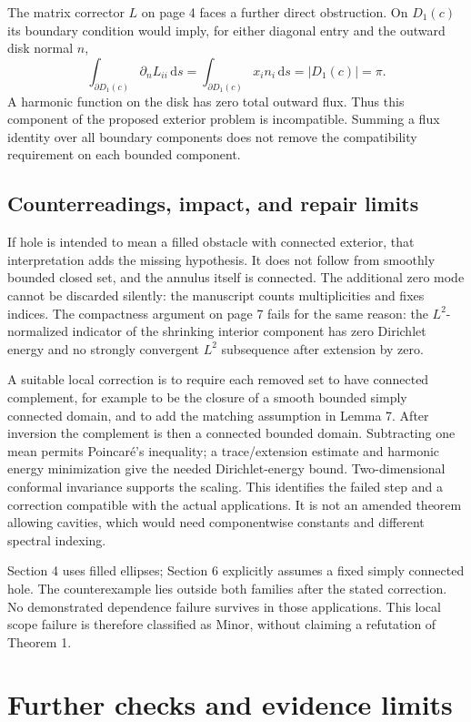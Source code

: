 \documentclass[10pt]{article}
\begin{document}
The matrix corrector \(L\) on page 4 faces a further direct obstruction. On \(D_1(c)\) its boundary condition would imply, for either diagonal entry and the outward disk normal \(n\), \[\int_{\partial D_1(c)}\partial_n L_{ii}\,\mathrm ds
 =\int_{\partial D_1(c)}x_i n_i\,\mathrm ds=|D_1(c)|=\pi.\] A harmonic function on the disk has zero total outward flux. Thus this component of the proposed exterior problem is incompatible. Summing a flux identity over all boundary components does not remove the compatibility requirement on each bounded component.\par
\subsection*{Counterreadings, impact, and repair limits}
If hole is intended to mean a filled obstacle with connected exterior, that interpretation adds the missing hypothesis. It does not follow from smoothly bounded closed set, and the annulus itself is connected. The additional zero mode cannot be discarded silently: the manuscript counts multiplicities and fixes indices. The compactness argument on page 7 fails for the same reason: the \(L^2\)-normalized indicator of the shrinking interior component has zero Dirichlet energy and no strongly convergent \(L^2\) subsequence after extension by zero.\par
A suitable local correction is to require each removed set to have connected complement, for example to be the closure of a smooth bounded simply connected domain, and to add the matching assumption in Lemma 7. After inversion the complement is then a connected bounded domain. Subtracting one mean permits Poincaré’s inequality; a trace/extension estimate and harmonic energy minimization give the needed Dirichlet-energy bound. Two-dimensional conformal invariance supports the scaling. This identifies the failed step and a correction compatible with the actual applications. It is not an amended theorem allowing cavities, which would need componentwise constants and different spectral indexing.\par
Section 4 uses filled ellipses; Section 6 explicitly assumes a fixed simply connected hole. The counterexample lies outside both families after the stated correction. No demonstrated dependence failure survives in those applications. This local scope failure is therefore classified as Minor, without claiming a refutation of Theorem 1.\par
\section*{Further checks and evidence limits}
\end{document}

